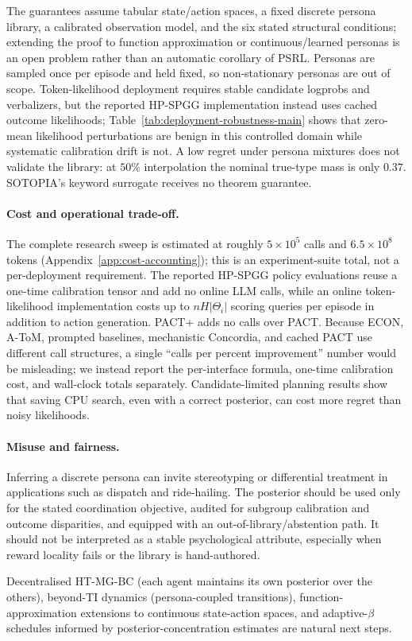 \documentclass{article}
\def\textsuperscript#1{#1}%
\begin{document}
The guarantees assume tabular state/action spaces, a fixed discrete persona library, a calibrated observation model, and the six stated structural conditions; extending the proof to function approximation or continuous/learned personas is an open problem rather than an automatic corollary of PSRL. Personas are sampled once per episode and held fixed, so non-stationary personas are out of scope. Token-likelihood deployment requires stable candidate logprobs and verbalizers, but the reported HP-SPGG implementation instead uses cached outcome likelihoods; Table~\ref{tab:deployment-robustness-main} shows that zero-mean likelihood perturbations are benign in this controlled domain while systematic calibration drift is not. A low regret under persona mixtures does not validate the library: at $50\%$ interpolation the nominal true-type mass is only $0.37$. SOTOPIA's keyword surrogate receives no theorem guarantee.

\paragraph{Cost and operational trade-off.} The complete research sweep is estimated at roughly $5\times10^5$ calls and $6.5\times10^8$ tokens (Appendix~\ref{app:cost-accounting}); this is an experiment-suite total, not a per-deployment requirement. The reported HP-SPGG policy evaluations reuse a one-time calibration tensor and add no online LLM calls, while an online token-likelihood implementation costs up to $nH|\Theta_i|$ scoring queries per episode in addition to action generation. PACT\textsuperscript{+} adds no calls over PACT. Because ECON, A-ToM, prompted baselines, mechanistic Concordia, and cached PACT use different call structures, a single ``calls per percent improvement'' number would be misleading; we instead report the per-interface formula, one-time calibration cost, and wall-clock totals separately. Candidate-limited planning results show that saving CPU search, even with a correct posterior, can cost more regret than noisy likelihoods.

\paragraph{Misuse and fairness.} Inferring a discrete persona can invite stereotyping or differential treatment in applications such as dispatch and ride-hailing. The posterior should be used only for the stated coordination objective, audited for subgroup calibration and outcome disparities, and equipped with an out-of-library/abstention path. It should not be interpreted as a stable psychological attribute, especially when reward locality fails or the library is hand-authored.

Decentralised HT-MG-BC (each agent maintains its own posterior over the others), beyond-TI dynamics (persona-coupled transitions), function-approximation extensions to continuous state-action spaces, and adaptive-$\beta$ schedules informed by posterior-concentration estimates are natural next steps.




\appendix


\end{document}
